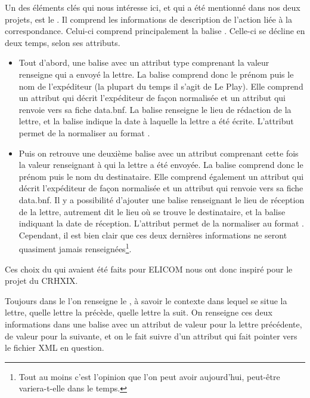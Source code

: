 Un des éléments clés qui nous intéresse ici, et qui a été mentionné dans nos deux projets, est le . Il comprend les informations de description de l'action liée à la correspondance. Celui-ci comprend principalement la balise . Celle-ci se décline en deux temps, selon ses attributs.

\begin{itemize}
    \item Tout d'abord, une balise  avec un attribut type comprenant la valeur  renseigne qui a envoyé la lettre. La balise  comprend donc le prénom puis le nom de l'expéditeur (la plupart du temps il s'agit de Le Play). Elle comprend un attribut  qui décrit l'expéditeur de façon normalisée et un attribut  qui renvoie vers sa fiche data.bnf. La balise  renseigne le lieu de rédaction de la lettre, et la balise  indique la date à laquelle la lettre a été écrite. L'attribut  permet de la normaliser au format . 
    
    \item Puis on retrouve une deuxième balise  avec un attribut  comprenant cette fois la valeur  renseignant à qui la lettre a été envoyée. La balise  comprend donc le prénom puis le nom du destinataire. Elle comprend également un attribut  qui décrit l'expéditeur de façon normalisée et un attribut  qui renvoie vers sa fiche data.bnf. Il y a possibilité d'ajouter une balise  renseignant le lieu de réception de la lettre, autrement dit le lieu où se trouve le destinataire, et la balise  indiquant la date de réception. L'attribut  permet de la normaliser au format . Cependant, il est bien clair que ces deux dernières informations ne seront quasiment jamais renseignées\footnote{Tout au moins c'est l'opinion que l'on peut avoir aujourd'hui, peut-être variera-t-elle dans le temps.}.
\end{itemize}
Ces choix du  qui avaient été faits pour ELICOM nous ont donc inspiré pour le projet du CRHXIX.

Toujours dans le  l'on renseigne le , à savoir le contexte dans lequel se situe la lettre, quelle lettre la précède, quelle lettre la suit. On renseigne ces deux informations dans une balise  avec un attribut  de valeur  pour la lettre précédente, de valeur  pour la suivante, et on le fait suivre d'un attribut  qui fait pointer vers le fichier XML en question.

